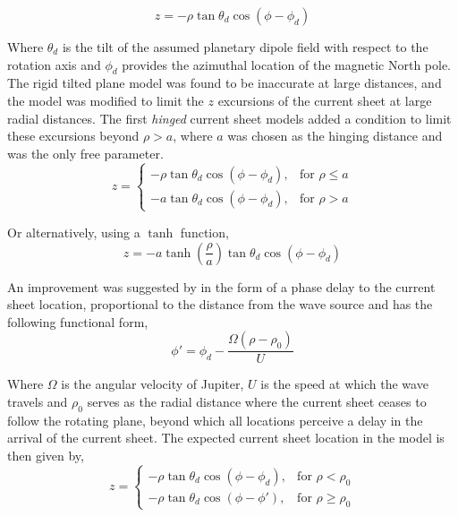 \begin{equation}
    z = -\rho \tan\theta_d \cos\left(\phi - \phi_d\right)
\end{equation}

Where $\theta_d$ is the tilt of the assumed planetary dipole field with respect to the rotation axis and $\phi_d$ provides the azimuthal location of the magnetic North pole. The rigid tilted plane model was found to be inaccurate at large distances, and the model was modified to limit the $z$ excursions of the current sheet at large radial distances. The first \emph{hinged} current sheet models \cite{Smith1974The10,Hill1974ConfigurationMagnetosphere} added a condition to limit these excursions beyond $\rho > a$, where $a$ was chosen as the hinging distance and was the only free parameter.
\begin{equation}
    z = \begin{cases}
    -\rho \tan\theta_d \cos\left(\phi - \phi_d\right), & \text{for } \rho \leq a\\
    -a \tan\theta_d \cos\left(\phi - \phi_d\right), & \text{for } \rho > a
    \end{cases}
\end{equation}

Or alternatively, using a $\tanh$ function, 
\begin{equation}
    z = -a \tanh\left(\frac{\rho}{a}\right) \tan\theta_d \cos\left(\phi - \phi_d\right)
\end{equation}

An improvement was suggested by  in the form of a phase delay to the current sheet location, proportional to the distance from the wave source and has the following functional form,
\begin{equation}
    \phi' = \phi_d - \frac{\Omega \left( \rho - \rho_0\right)}{U}
\end{equation}

Where $\Omega$ is the angular velocity of Jupiter, $U$ is the speed at which the wave travels and $\rho_0$ serves as the radial distance where the current sheet ceases to follow the rotating plane, beyond which all locations perceive a delay in the arrival of the current sheet. The expected current sheet location in the  model is then given by,
\begin{equation}
    z = \begin{cases}
    -\rho \tan\theta_d \cos\left(\phi - \phi_d\right), & \text{for } \rho < \rho_0\\
    -\rho \tan\theta_d \cos\left(\phi - \phi'\right),  & \text{for } \rho \geq \rho_0
    \end{cases}
    \label{eqn:kivelson1978}
\end{equation}

